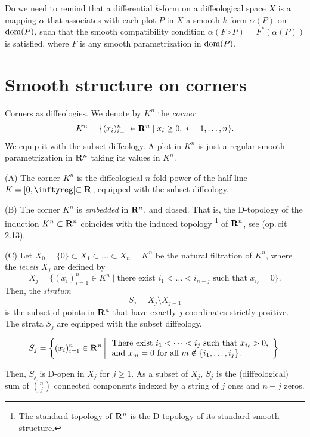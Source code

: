 Do we need to remind that a differential $k$-form on a diffeological space $X$ is a mapping $\alpha$ that associates with each plot $P$ in $X$
a smooth $k$-form $\alpha(P)$ on $\mathrm{dom}(P)$,
such that the smooth compatibility condition $\alpha(F \circ P) = F^*(\alpha(P))$ is satisfied,
where $F$ is any smooth parametrization in $\mathrm{dom}(P)$.

\section{Smooth structure on corners}

\begin{Article}{Corners as diffeologies.}{}
  We denote by $K^n$ the \emph{corner}
  $$%
    K^n = \{ (x_i)_{i=1}^n \in \RR^n \mid x_i \geq 0,\ i=1,\dots,n\}.
  $$%
  We equip it with the subset diffeology.
  A plot in $K^n$ is just a regular smooth parametrization in $\mathbf{R}^n$ taking its values in $K^n$.
  
  (A) The corner $K^n$ is the diffeological $n$-fold power of the half-line $K = [0,\infty[ \subset \RR$,
  equipped with the subset diffeology.
  
  (B) The corner $K^n$ is \emph{embedded} in $\mathbf{R}^n$,
  and closed.
  That is,
  the D-topology of the induction $K^n \subset \mathbf{R}^n$ coincides with the induced topology%
  \footnote{The standard topology of $\mathbf{R}^n$ is the D-topology of its standard smooth structure.}
  of $\mathbf{R}^n$,
  see (op.\,cit \textsection\,2.13).
  
  (C) Let $X_0 = \{0\} \subset X_1 \subset \dots \subset X_n = K^n$ be the natural filtration of $K^n$,
  where the \emph{levels} $X_j$ are defined by
  $$%
    X_j = \{(x_i)_{i=1}^n \in K^n \mid \text{there exist } i_1 < \dots < i_{n-j} \text{ such that } x_{i_\ell} = 0 \}.
  $$%
  Then,
  the \emph{stratum}
  $$%
    S_j = X_j \setminus X_{j-1}
  $$%
  is the subset of points in $\mathbf{R}^n$ that have exactly $j$ coordinates strictly positive.
  The strata $S_j$ are equipped with the subset diffeology.\footnotemark
  
  $$%
    S_j = \bigg\{
    (x_i)_{i=1}^n \in \RR^n \, \bigg| \,
    \begin{array}{l}
    \text{There exist } i_1 < \dots < i_j \text{ such that } x_{i_\ell} > 0, \\
    \text{and } x_m = 0 \text{ for all } m \notin \{i_1,\dots,i_j\}.
    \end{array}
    \bigg\}.
  $$%
  
  Then,
  $S_j$ is D-open in $X_j$ for $j \geq 1$.
  As a subset of $X_j$,
  $S_j$ is the (diffeological) sum of $\binom{n}{j}$ connected components indexed by a string of $j$ ones and $n-j$ zeros.
\end{Article}

